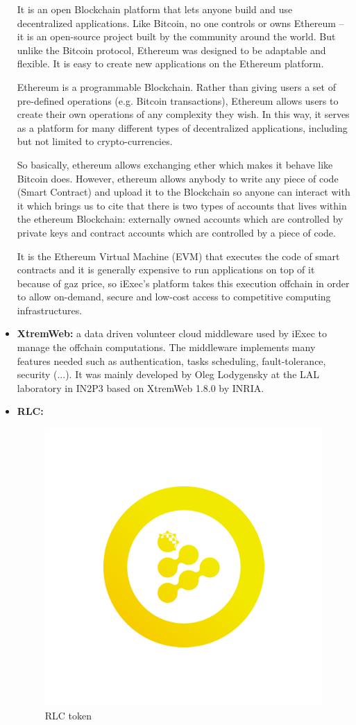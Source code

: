\begin{itemize}
        It is an open Blockchain platform that lets anyone build and use decentralized
        applications. Like Bitcoin, no one controls or owns Ethereum – it is an open-source project built
        by the community around the world. But unlike the Bitcoin protocol, Ethereum was designed to be
        adaptable and flexible. It is easy to create new applications on the Ethereum platform.
        
        Ethereum is a programmable Blockchain. Rather than giving users a set of pre-defined operations
        (e.g. Bitcoin transactions), Ethereum allows users to create their own operations of any complexity
        they wish. In this way, it serves as a platform for many different types of decentralized applications,
        including but not limited to crypto-currencies.
        
        So basically, ethereum allows exchanging ether which makes it behave like Bitcoin does. However,
        ethereum allows anybody to write any piece of code (Smart Contract) and upload it to the Blockchain
        so anyone can interact with it which brings us to cite that there is two types of accounts that lives
        within the ethereum Blockchain: externally owned accounts which are controlled by private keys and
        contract accounts which are controlled by a piece of code.
        
        It is the Ethereum Virtual Machine (EVM) that executes the code of smart contracts and it is
        generally expensive to run applications on top of it because of gaz price, so iExec's
        platform takes this execution offchain in order to allow on-demand, secure and low-cost access to
        competitive computing infrastructures.

        \item \textbf{XtremWeb\cite{xtremweb}:} a data driven volunteer cloud middleware used by iExec to manage
        the offchain computations. The middleware implements many features needed such as authentication,
        tasks scheduling, fault-tolerance, security (...). \newline
        It was mainly developed by Oleg Lodygensky\cite{oleg-lodygensky} at the LAL laboratory in IN2P3 based on
        XtremWeb 1.8.0 by INRIA.

        \item \textbf{RLC\cite{RLC}:}

        \begin{figure}[!h]\centering
            \includegraphics[width=.3\columnwidth]{3-State-of-the-art/figs/RLC.png}
            \caption{RLC token}
        \end{figure}


\end{itemize}
